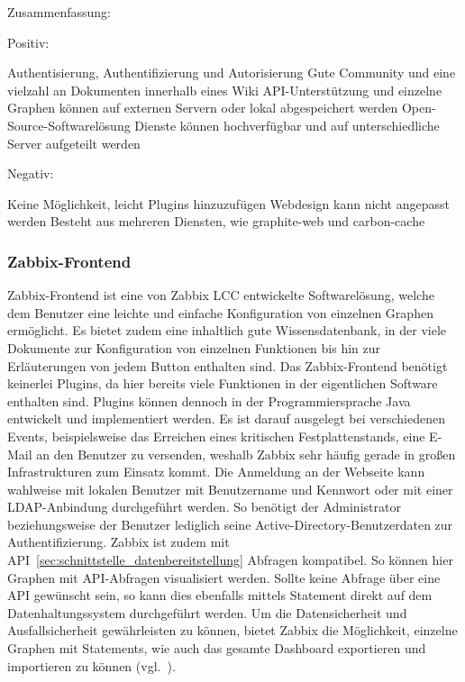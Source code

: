 Zusammenfassung:

Positiv:

\begin{outline}
  \1 Authentisierung, Authentifizierung und Autorisierung
  \1 Gute Community und eine vielzahl an Dokumenten innerhalb eines Wiki
  \1 \gls{API}\hyp{}Unterstützung
  \1  und einzelne Graphen können auf externen
  Servern oder lokal abgespeichert werden
  \1 Open\hyp{}Source\hyp{}Softwarelösung
  \1 Dienste können hochverfügbar und auf unterschiedliche Server aufgeteilt
  werden
\end{outline}

Negativ:

\begin{outline}
  \1 Keine Möglichkeit, leicht Plugins hinzuzufügen
  \1 Webdesign kann nicht angepasst werden
  \1 Besteht aus mehreren Diensten, wie graphite\hyp{}web und carbon\hyp{}cache
\end{outline}
\mr%

\subsubsection{Zabbix-Frontend}
\label{subsubsec:zabbix-frontend}
Zabbix\hyp{}Frontend ist eine von Zabbix LCC entwickelte Softwarelösung, welche
dem Benutzer eine leichte und einfache Konfiguration von einzelnen Graphen
ermöglicht. Es bietet zudem eine inhaltlich gute Wissensdatenbank, in der viele
Dokumente zur Konfiguration von einzelnen Funktionen bis hin zur Erläuterungen
von jedem Button enthalten sind. Das Zabbix\hyp{}Frontend benötigt keinerlei
Plugins, da hier bereits viele Funktionen in der eigentlichen Software
enthalten sind. Plugins können dennoch in der Programmiersprache Java
entwickelt und implementiert werden. Es ist darauf ausgelegt bei verschiedenen
Events, beispielsweise das Erreichen eines kritischen Festplattenstands, eine
E\hyp{}Mail an den Benutzer zu versenden, weshalb Zabbix sehr häufig gerade in
großen Infrastrukturen zum Einsatz kommt. Die Anmeldung an der Webseite
kann wahlweise mit lokalen Benutzer mit Benutzername und Kennwort oder mit
einer \gls{LDAP}\hyp{}Anbindung durchgeführt werden. So benötigt der
Administrator beziehungsweise der Benutzer lediglich seine
Active\hyp{}Directory\hyp{}Benutzerdaten zur Authentifizierung. Zabbix ist
zudem mit \gls{API}~\ref{sec:schnittstelle_datenbereitstellung} Abfragen
kompatibel. So können hier Graphen mit \gls{API}\hyp{}Abfragen visualisiert
werden. Sollte keine Abfrage über eine \gls{API} gewünscht sein, so kann dies
ebenfalls mittels \gls{Statement} direkt auf dem Datenhaltungssystem
durchgeführt werden. Um die Datensicherheit und Ausfallsicherheit gewährleisten
zu können, bietet Zabbix die Möglichkeit, einzelne Graphen mit Statements, wie
auch das gesamte Dashboard exportieren und importieren zu können
(vgl.~\cite{zabbix-frontend}).


